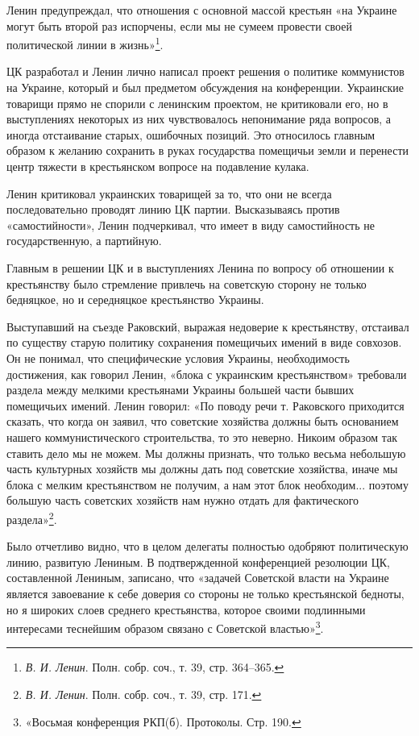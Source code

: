 \documentclass[12pt, a4paper, openany]{book}
\begin{document}
Ленин предупреждал, что отношения с основной массой крестьян «на Украине могут быть второй раз испорчены, если мы не сумеем провести своей политической линии в жизнь»\footnote{\textit{В. И. Ленин}. Полн. собр. соч., т. 39, стр. 364–365.}.

ЦК разработал и Ленин лично написал проект решения о политике коммунистов на Украине, который и был предметом обсуждения на конференции. Украинские товарищи прямо не спорили с ленинским проектом, не критиковали его, но в выступлениях некоторых из них чувствовалось непонимание ряда вопросов, а иногда отстаивание старых, ошибочных позиций. Это относилось главным образом к желанию сохранить в руках государства помещичьи земли и перенести центр тяжести в крестьянском вопросе на подавление кулака.

Ленин критиковал украинских товарищей за то, что они не всегда последовательно проводят линию ЦК партии. Высказываясь против «самостийности», Ленин подчеркивал, что имеет в виду самостийность не государственную, а партийную.

Главным в решении ЦК и в выступлениях Ленина по вопросу об отношении к крестьянству было стремление привлечь на советскую сторону не только бедняцкое, но и середняцкое крестьянство Украины.

Выступавший на съезде Раковский, выражая недоверие к крестьянству, отстаивал по существу старую политику сохранения помещичьих имений в виде совхозов. Он не понимал, что специфические условия Украины, необходимость достижения, как говорил Ленин, «блока с украинским крестьянством» требовали раздела между мелкими крестьянами Украины большей части бывших помещичьих имений. Ленин говорил: «По поводу речи т. Раковского приходится сказать, что когда он заявил, что советские хозяйства должны быть основанием нашего коммунистического строительства, то это неверно. Никоим образом так ставить дело мы не можем. Мы должны признать, что только весьма небольшую часть культурных хозяйств мы должны дать под советские хозяйства, иначе мы блока с мелким крестьянством не получим, а нам этот блок необходим... поэтому большую часть советских хозяйств нам нужно отдать для фактического раздела»\footnote{\textit{В. И. Ленин}. Полн. собр. соч., т. 39, стр. 171.}.

Было отчетливо видно, что в целом делегаты полностью одобряют политическую линию, развитую Лениным. В подтвержденной конференцией резолюции ЦК, составленной Лениным, записано, что «задачей Советской власти на Украине является завоевание к себе доверия со стороны не только крестьянской бедноты, но я широких слоев среднего крестьянства, которое своими подлинными интересами теснейшим образом связано с Советской властью»\footnote{«Восьмая конференция РКП(б). Протоколы. Стр. 190.}.
\end{document}

